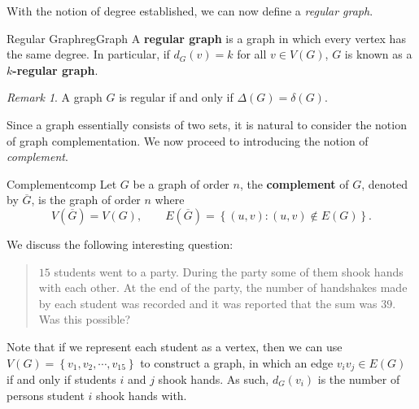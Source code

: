 \documentclass[math, code]{amznotes}
\theoremstyle{remark}
\newtheorem*{remark}{Remark}
\begin{document}
With the notion of degree established, we can now define a \textit{regular graph}.
\begin{dfnbox}{Regular Graph}{regGraph}
    A {\color{red} \textbf{regular graph}} is a graph in which every vertex has the same degree. In particular, if $d_G(v) = k$ for all $v \in V(G)$, $G$ is known as a {\color{red} \textbf{$k$-regular graph}}.
\end{dfnbox}
\begin{notebox}
    \begin{remark}
        A graph $G$ is regular if and only if $\Delta(G) = \delta(G)$.
    \end{remark}
\end{notebox}
Since a graph essentially consists of two sets, it is natural to consider the notion of graph complementation. We now proceed to introducing the notion of \textit{complement}.
\begin{dfnbox}{Complement}{comp}
    Let $G$ be a graph of order $n$, the {\color{red} \textbf{complement}} of $G$, denoted by $\overline{G}$, is the graph of order $n$ where
    \begin{equation*}
        V\left(\overline{G}\right) = V(G), \qquad E\left(\overline{G}\right) = \left\{(u, v) \colon (u, v) \notin E(G)\right\}.
    \end{equation*}
\end{dfnbox}
We discuss the following interesting question:
\begin{quote}
    $15$ students went to a party. During the party some of them shook hands with each other. At the end of the party, the number of handshakes made by each student was recorded and it was reported that the sum was $39$. Was this possible?
\end{quote}
Note that if we represent each student as a vertex, then we can use $V(G) = \left\{v_1, v_2, \cdots, v_{15}\right\}$ to construct a graph, in which an edge $v_iv_j \in E(G)$ if and only if students $i$ and $j$ shook hands. As such, $d_G(v_i)$ is the number of persons student $i$ shook hands with.
\end{document}
